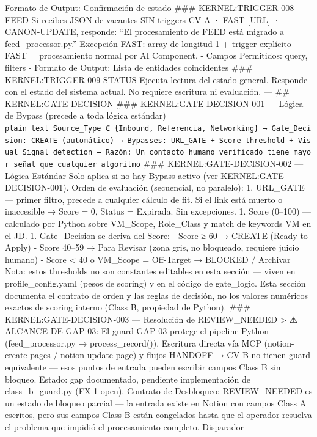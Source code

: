 \documentclass[
]{article}
\begin{document}
Formato de Output: Confirmación de estado \#\#\# KERNEL:TRIGGER-008 FEED
Si recibes JSON de vacantes SIN triggers CV‑A · FAST {[}URL{]} ·
CANON‑UPDATE, responde: ``El procesamiento de FEED está migrado a
feed\_processor.py.'' Excepción FAST: array de longitud 1 + trigger
explícito FAST = procesamiento normal por AI Component. - Campos
Permitidos: query, filters - Formato de Output: Lista de entidades
coincidentes \#\#\# KERNEL:TRIGGER-009 STATUS Ejecuta lectura del estado
general. Responde con el estado del sistema actual. No requiere
escritura ni evaluación. --- \#\# KERNEL:GATE-DECISION \#\#\#
KERNEL:GATE-DECISION-001 --- Lógica de Bypass (precede a toda lógica
estándar)
\texttt{plain\ text\ Source\_Type\ ∈\ \{Inbound,\ Referencia,\ Networking\}\ →\ Gate\_Decision:\ CREATE\ (automático)\ →\ Bypasses:\ URL\_GATE\ +\ Score\ threshold\ +\ Visual\ Signal\ detection\ →\ Razón:\ Un\ contacto\ humano\ verificado\ tiene\ mayor\ señal\ que\ cualquier\ algoritmo}
\#\#\# KERNEL:GATE-DECISION-002 --- Lógica Estándar Solo aplica si no
hay Bypass activo (ver KERNEL:GATE-DECISION-001). Orden de evaluación
(secuencial, no paralelo): 1. URL\_GATE --- primer filtro, precede a
cualquier cálculo de fit. Si el link está muerto o inaccesible → Score =
0, Status = Expirada. Sin excepciones. 1. Score (0--100) --- calculado
por Python sobre VM\_Scope, Role\_Class y match de keywords VM en el JD.
1. Gate\_Decision se deriva del Score: - Score ≥ 60 → CREATE
(Ready-to-Apply) - Score 40--59 → Para Revisar (zona gris, no bloqueado,
requiere juicio humano) - Score \textless{} 40 o VM\_Scope = Off-Target
→ BLOCKED / Archivar Nota: estos thresholds no son constantes editables
en esta sección --- viven en profile\_config.yaml (pesos de scoring) y
en el código de gate\_logic. Esta sección documenta el contrato de orden
y las reglas de decisión, no los valores numéricos exactos de scoring
interno (Class B, propiedad de Python). \#\#\# KERNEL:GATE-DECISION-003
--- Resolución de REVIEW\_NEEDED \textgreater{} ⚠️ ALCANCE DE GAP-03: El
guard GAP-03 protege el pipeline Python (feed\_processor.py →
process\_record()). Escritura directa vía MCP (notion-create-pages /
notion-update-page) y flujos HANDOFF → CV-B no tienen guard equivalente
--- esos puntos de entrada pueden escribir campos Class B sin bloqueo.
Estado: gap documentado, pendiente implementación de class\_b\_guard.py
(FX-1 open). Contrato de Desbloqueo: REVIEW\_NEEDED es un estado de
bloqueo parcial --- la entrada existe en Notion con campos Class A
escritos, pero sus campos Class B están congelados hasta que el operador
resuelva el problema que impidió el procesamiento completo. Disparador
\end{document}
